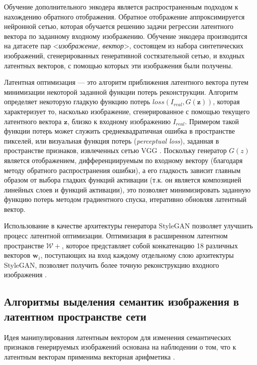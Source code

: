 Обучение дополнительного энкодера \cite{donahue2016adversarial} является распространенным подходом к нахождению обратного отображения.
Обратное отображение аппроксимируется нейронной сетью, которая обучается решению задачи регрессии латентного вектора по заданному входному изображению. 
Обучение энкодера производится на датасете пар <\emph{изображение, вектор}>, состоящем из набора синтетических изображений, сгенерированных генеративной состязательной сетью, и входных латентных векторов, с помощью которых эти изображения были получены.

Латентная оптимизация \cite{perarnau2016invertible} --- это алгоритм приближения латентного вектора путем минимизации некоторой заданной функции потерь реконструкции.
Алгоритм определяет некоторую гладкую функцию потерь $loss(I_{real}, G(\mathbf z)) $, которая характеризует то, насколько изображение, сгенерированное с помощью текущего латентного вектора $\mathbf z$, близко к входному изображению $I_{real}$.
Примером такой функции потерь может служить среднеквадратичная ошибка в пространстве пикселей, или визуальная функция потерь (\emph{perceptual loss}), заданная в пространстве признаков, извлеченных сетью VGG \cite{Johnson2016Perceptual}.
Поскольку генератор $G(z)$ является отображением, дифференциируемым по входному вектору (благодаря методу обратного распространения ошибки), а его гладкость зависит главным образом от выбора гладких функций активации (т.к. он является композицией линейных слоев и функций активации), это позволяет минимизировать заданную функцию потерь методом градиентного спуска, итеративно обновляя латентный вектор.

Использование в качестве архитектуры генератора StyleGAN позволяет улучшить процесс латентной оптимизации.
Оптимизация в расширенном латентном пространстве $\mathcal W+$, которое представляет собой конкатенацию 18 различных векторов $\mathbf w_i$, поступающих на вход каждому отдельному слою архитектуры StyleGAN, позволяет получить более точную реконструкцию входного изображения \cite{abdal2019image2stylegan}.


\subsection{Алгоритмы выделения семантик изображения в латентном пространстве сети}

Идея манипулирования латентным вектором для изменения семантических признаков генерируемых изображений основана на наблюдении о том, что к латентным векторам применима векторная арифметика \cite{radford2015unsupervised}.


